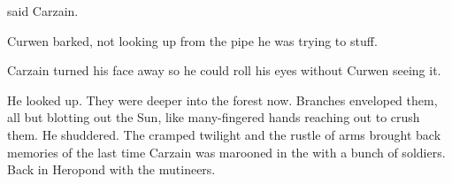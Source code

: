  said Carzain. 

 Curwen barked, not looking up from the pipe he was trying to stuff. 





Carzain turned his face away so he could roll his eyes without Curwen seeing it. 

He looked up.
They were deeper into the forest now. 
Branches enveloped them, all but blotting out the Sun, like many-fingered hands reaching out to crush them. 
He shuddered. 
The cramped twilight and the rustle of arms brought back memories of the last time Carzain was marooned in the \Wylde{} with a bunch of soldiers. 
Back in Heropond with the mutineers. 













